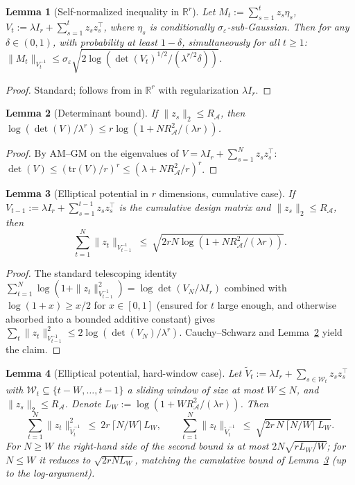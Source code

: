 \documentclass[11pt]{article}
\newcommand{\R}{\mathbb{R}}
\newcommand{\cA}{\mathcal{A}}
\newcommand{\tr}{\mathrm{tr}}
\newtheorem{lemma}{Lemma}
\begin{document}
\begin{lemma}[Self-normalized inequality in $\R^r$]
\label{lem:self_normalized_r}
Let $M_t:=\sum_{s=1}^t z_s\eta_s$, $V_t:=\lambda I_r+\sum_{s=1}^t z_sz_s^\top$,
where $\eta_s$ is conditionally $\sigma_\varepsilon$-sub-Gaussian.
Then for any $\delta\in(0,1)$, with probability at least $1-\delta$, simultaneously
for all $t\ge 1$:
$\|M_t\|_{V_t^{-1}}
\le\sigma_\varepsilon\sqrt{2\log(\det(V_t)^{1/2}/(\lambda^{r/2}\delta))}$.
\end{lemma}

\begin{proof}
Standard; follows from \citet[Theorem~1]{abbasi2011improved} in $\R^r$ with
regularization $\lambda I_r$.
\end{proof}

\begin{lemma}[Determinant bound]
\label{lem:det_bound_r}
If $\|z_s\|_2\le R_{\cA}$, then
$\log(\det(V)/\lambda^r)\le r\log(1+NR_{\cA}^2/(\lambda r))$.
\end{lemma}

\begin{proof}
By AM--GM on the eigenvalues of $V=\lambda I_r+\sum_{s=1}^N z_sz_s^\top$:
$\det(V)\le(\tr(V)/r)^r\le(\lambda+NR_{\cA}^2/r)^r$.
\end{proof}

\begin{lemma}[Elliptical potential in $r$ dimensions, cumulative case]
\label{lem:elliptical_r}
If $V_{t-1}:=\lambda I_r+\sum_{s=1}^{t-1}z_sz_s^\top$ is the
\emph{cumulative} design matrix and $\|z_s\|_2\le R_{\cA}$, then
\[
  \sum_{t=1}^N\|z_t\|_{V_{t-1}^{-1}}
  \ \le\ \sqrt{2rN\log(1+NR_{\cA}^2/(\lambda r))}.
\]
\end{lemma}

\begin{proof}
The standard telescoping identity
$\sum_{t=1}^N\log(1+\|z_t\|_{V_{t-1}^{-1}}^2)=\log\det(V_N/\lambda I_r)$
combined with $\log(1+x)\ge x/2$ for $x\in[0,1]$ (ensured for $t$ large enough,
and otherwise absorbed into a bounded additive constant) gives
$\sum_t\|z_t\|_{V_{t-1}^{-1}}^2\le 2\log(\det(V_N)/\lambda^r)$.  Cauchy--Schwarz
and Lemma~\ref{lem:det_bound_r} yield the claim.
\end{proof}

\begin{lemma}[Elliptical potential, hard-window case]
\label{lem:elliptical_r_windowed}
Let $\widetilde V_t:=\lambda I_r+\sum_{s\in\mathcal W_t}z_sz_s^\top$ with
$\mathcal W_t\subseteq\{t-W,\ldots,t-1\}$ a sliding window of size at most $W\le N$,
and $\|z_s\|_2\le R_{\cA}$.  Denote
$L_W:=\log(1+WR_{\cA}^2/(\lambda r))$.  Then
\begin{equation}
  \sum_{t=1}^N\|z_t\|_{\widetilde V_t^{-1}}^2
  \ \le\ 2r\,\lceil N/W\rceil\,L_W,
  \qquad
  \sum_{t=1}^N\|z_t\|_{\widetilde V_t^{-1}}
  \ \le\ \sqrt{2r\,N\,\lceil N/W\rceil\,L_W}.
  \label{eq:elliptical_windowed}
\end{equation}
For $N\ge W$ the right-hand side of the second bound is at most
$2N\sqrt{rL_W/W}$; for $N\le W$ it reduces to $\sqrt{2rNL_W}$, matching the
cumulative bound of Lemma~\ref{lem:elliptical_r} (up to the log-argument).
\end{lemma}
\end{document}
